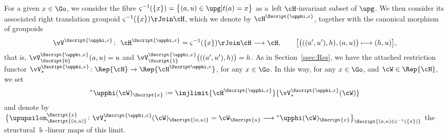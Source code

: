 For a given $x \in\Go$, we consider the fibre $\varsigma^{-1}(\{x\})=\big\{ (a,u) \in \upg| t(a)=x \big\}$ as a~left $\cH$-invariant subset of $\upg$. We then consider its associated right translation groupoid $\varsigma^{-1}(\{x\}) \rJoin \cH$, which we denote by $\cH^{\Sscript{\upphi, x}}$, together with the canonical morphism of groupoids
\begin{gather*}
\vV^{\Sscript{\upphi, x}}\colon \ \cH^{\Sscript{\upphi, x}}= \varsigma^{-1}(\{x\}) \rJoin \cH \longrightarrow \cH, \qquad \big[ \big( ((a',u'),h), (a,u)\big) \longmapsto (h,u) \big],
\end{gather*}
that is, $\vV^{\Sscript{\upphi, x}}_{\Sscript{0}}(a,u)=u$ and $\vV^{\Sscript{\upphi, x}}_{\Sscript{1}}\big( ((a',u'),h) \big)=h$. As in Section~\ref{ssec:Res}, we have the attached restriction
functor $\vV^{\Sscript{\upphi, x}}_*\colon \Rep{\cH} \to \Rep{\cH^{\Sscript\upphi, x}}$, for any $x \in \Go$.
In this way, for any $x \in \Go$, and $\cW \in \Rep{\cH}$, we set\begin{gather}\label{Eq:SPx} {}^*\upphi(\cW)_{\Sscript{x}}: = \injlimit{\cH^{\Sscript{\upphi,
x}}}{\vV^{\Sscript{\upphi, x}}_*(\cW)}
\end{gather}
and denote by $\big\{\upupsilon^{\Sscript{x}}_{\Sscript{(a, u)}}\colon \vV^{\Sscript{\upphi, x}}_*(\cW)_{\Sscript{(a, u)}}=\cW_{\Sscript{u}} \longrightarrow {}^*\upphi(\cW)_{\Sscript{x}} \big\}_{\Sscript{(a, u) \in \varsigma^{-1}(\{x\})}}$ the structural $\Bbbk$-linear maps of this limit.


